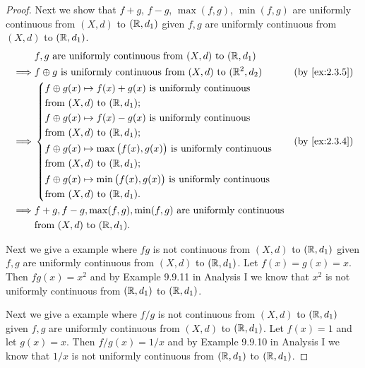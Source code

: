 \begin{proof}
  Next we show that \(f + g\), \(f - g\), \(\max(f, g)\), \(\min(f, g)\) are uniformly continuous from \((X, d)\) to \((\mathbb{R}, d_1)\) given \(f, g\) are uniformly continuous from \((X, d)\) to \((\mathbb{R}, d_1)\).
  \begin{align*}
             & f, g \text{ are uniformly continuous from } (X, d) \text{ to } (\R, d_1)                             \\
    \implies & f \oplus g \text{ is uniformly continuous from } (X, d) \text{ to } (\R^2, d_2)   &  & \by{ex:2.3.5} \\
    \implies & \begin{dcases}
                 f \oplus g(x) \mapsto f(x) + g(x) \text{ is uniformly continuous}              \\
                 \text{from } (X, d) \text{ to } (\R, d_1);                                     \\
                 f \oplus g(x) \mapsto f(x) - g(x) \text{ is uniformly continuous}              \\
                 \text{from } (X, d) \text{ to } (\R, d_1);                                     \\
                 f \oplus g(x) \mapsto \max\big(f(x), g(x)\big) \text{ is uniformly continuous} \\
                 \text{from } (X, d) \text{ to } (\R, d_1);                                     \\
                 f \oplus g(x) \mapsto \min\big(f(x), g(x)\big) \text{ is uniformly continuous} \\
                 \text{from } (X, d) \text{ to } (\R, d_1).
               \end{dcases} &  & \by{ex:2.3.4}                       \\
    \implies & f + g, f - g, \max(f, g), \min(f, g) \text{ are uniformly continuous}                                \\
             & \text{from } (X, d) \text{ to } (\R, d_1).
  \end{align*}

  Next we give a example where \(fg\) is not continuous from \((X, d)\) to \((\mathbb{R}, d_1)\) given \(f, g\) are uniformly continuous from \((X, d)\) to \((\mathbb{R}, d_1)\).
  Let \(f(x) = g(x) = x\).
  Then \(fg(x) = x^2\) and by Example 9.9.11 in Analysis I we know that \(x^2\) is not uniformly continuous from \((\mathbb{R}, d_1)\) to \((\mathbb{R}, d_1)\).

  Next we give a example where \(f / g\) is not continuous from \((X, d)\) to \((\mathbb{R}, d_1)\) given \(f, g\) are uniformly continuous from \((X, d)\) to \((\mathbb{R}, d_1)\).
  Let \(f(x) = 1\) and let \(g(x) = x\).
  Then \(f / g(x) = 1 / x\) and by Example 9.9.10 in Analysis I we know that \(1 / x\) is not uniformly continuous from \((\mathbb{R}, d_1)\) to \((\mathbb{R}, d_1)\).


\end{proof}
